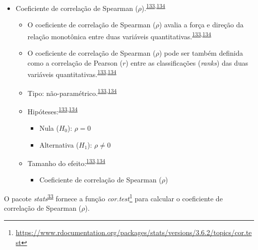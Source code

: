 \documentclass[
  a4paper,
]{book}
\providecommand{\tightlist}{%
  \setlength{\itemsep}{0pt}\setlength{\parskip}{0pt}}
\renewcommand{\href}[2]{#2\footnote{\url{#1}}}
\newenvironment{infobox}[1]
  {
  \begin{itemize}
  \renewcommand{\labelitemi}{
    \raisebox{-.7\height}[0pt][0pt]{
      {\setkeys{Gin}{width=3em,keepaspectratio}
        \texttt{[image: \#1]}}
    }
  }
  \setlength{\fboxsep}{1em}
  \begin{blackbox}
  \item
  }
  {
  \end{blackbox}
  \end{itemize}
  }
\begin{document}
\begin{itemize}
\item
  Coeficiente de correlação de Spearman (\(\rho\)).\textsuperscript{\protect\hyperlink{ref-khamis2008}{133},\protect\hyperlink{ref-allison2022}{134}}

  \begin{itemize}
  \item
    O coeficiente de correlação de Spearman (\(\rho\)) avalia a força e direção da relação monotônica entre duas variáveis quantitativas.\textsuperscript{\protect\hyperlink{ref-khamis2008}{133},\protect\hyperlink{ref-allison2022}{134}}
  \item
    O coeficiente de correlação de Spearman (\(\rho\)) pode ser também definida como a correlação de Pearson (\(r\)) entre as classificações (\emph{ranks}) das duas variáveis quantitativas.\textsuperscript{\protect\hyperlink{ref-khamis2008}{133},\protect\hyperlink{ref-allison2022}{134}}
  \item
    Tipo: não-paramétrico.\textsuperscript{\protect\hyperlink{ref-khamis2008}{133},\protect\hyperlink{ref-allison2022}{134}}
  \item
    Hipóteses:\textsuperscript{\protect\hyperlink{ref-khamis2008}{133},\protect\hyperlink{ref-allison2022}{134}}

    \begin{itemize}
    \item
      Nula (\(H_{0}\)): \(\rho=0\)
    \item
      Alternativa (\(H_{1}\)): \(\rho≠0\)
    \end{itemize}
  \item
    Tamanho do efeito:\textsuperscript{\protect\hyperlink{ref-khamis2008}{133},\protect\hyperlink{ref-allison2022}{134}}

    \begin{itemize}
    \tightlist
    \item
      Coeficiente de correlação de Spearman (\(\rho\))
    \end{itemize}
  \end{itemize}
\end{itemize}

\begin{infobox}{images/Rlogo}
O pacote \emph{stats}\textsuperscript{\protect\hyperlink{ref-stats-2}{33}} fornece a função \href{https://www.rdocumentation.org/packages/stats/versions/3.6.2/topics/cor.test}{\emph{cor.test}} para calcular o coeficiente de correlação de Spearman (\(\rho\)).

\end{infobox}
\end{document}
